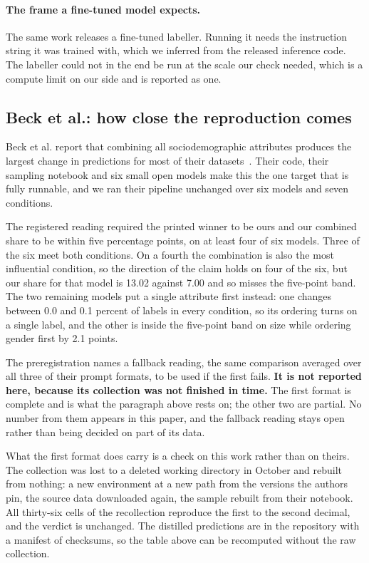 \paragraph{The frame a fine-tuned model expects.} The same work releases a
fine-tuned labeller. Running it needs the instruction string it was trained
with, which we inferred from the released inference code. The labeller could not
in the end be run at the scale our check needed, which is a compute limit on our
side and is reported as one.

\subsection{Beck et al.: how close the reproduction comes}

Beck et al. report that combining all sociodemographic attributes produces the
largest change in predictions for most of their datasets~\cite{beck2024}. Their
code, their sampling notebook and six small open models make this the one target
that is fully runnable, and we ran their pipeline unchanged over six models and
seven conditions.

The registered reading required the printed winner to be ours and our combined
share to be within five percentage points, on at least four of six models.
Three of the six meet both conditions. On a fourth the combination is also the
most influential condition, so the direction of the claim holds on four of the
six, but our share for that model is 13.02 against 7.00 and so misses the
five-point band. The two remaining models put a single attribute first instead:
one changes between 0.0 and 0.1 percent of labels in every condition, so its
ordering turns on a single label, and the other is inside the five-point band on
size while ordering gender first by 2.1 points.

The preregistration names a fallback reading, the same comparison averaged over
all three of their prompt formats, to be used if the first fails. \textbf{It is not reported here, because its collection was not finished in
time.} The first
format is complete and is what the paragraph above rests on; the other two are
partial. No number from them appears in this paper, and the fallback reading
stays open rather than being decided on part of its data.

What the first format does carry is a check on this work rather than on theirs.
The collection was lost to a deleted working directory in October and rebuilt
from nothing: a new environment at a new path from the versions the authors pin,
the source data downloaded again, the sample rebuilt from their notebook. All
thirty-six cells of the recollection reproduce the first to the second decimal,
and the verdict is unchanged. The distilled predictions are in the repository
with a manifest of checksums, so the table above can be recomputed without the
raw collection.

